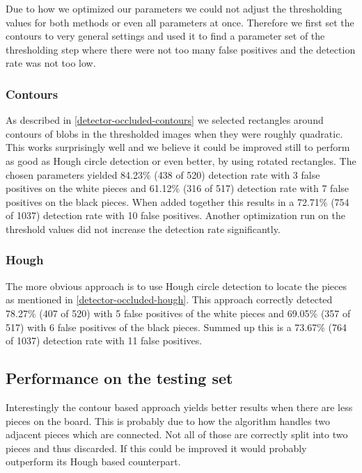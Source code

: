 	Due to how we optimized our parameters we could not adjust the thresholding values for both methods or even all parameters at once. Therefore we first set the contours to very general settings and used it to find a parameter set of the thresholding step where there were not too many false positives and the detection rate was not too low.

	\subsubsection{Contours}
	\label{evaluation-occluded-optimization-contours}
	As described in \autoref{detector-occluded-contours} we selected rectangles around contours of blobs in the thresholded images when they were roughly quadratic. This works surprisingly well and we believe it could be improved still to perform as good as Hough circle detection or even better, by using rotated rectangles. The chosen parameters yielded 84.23\% (438 of 520) detection rate with 3 false positives on the white pieces and 61.12\% (316 of 517) detection rate with 7 false positives on the black pieces. When added together this results in a 72.71\% (754 of 1037) detection rate with 10 false positives. Another optimization run on the threshold values did not increase the detection rate significantly.

	\subsubsection{Hough}
	\label{evaluation-occluded-optimization-hough}
	The more obvious approach is to use Hough circle detection to locate the pieces as mentioned in \autoref{detector-occluded-hough}. This approach correctly detected 78.27\% (407 of 520) with 5 false positives of the white pieces and 69.05\% (357 of 517) with 6 false positives of the black pieces. Summed up this is a 73.67\% (764 of 1037) detection rate with 11 false positives.

	\subsection{Performance on the testing set}
	\label{evaluation-occluded-performance}
	
	Interestingly the contour based approach yields better results when there are less pieces on the board. This is probably due to how the algorithm handles two adjacent pieces which are connected. Not all of those are correctly split into two pieces and thus discarded. If this could be improved it would probably outperform its Hough based counterpart.

